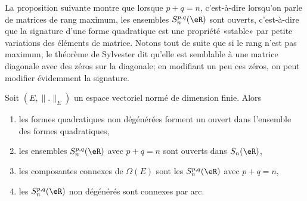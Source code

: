 La proposition suivante montre que lorsque \( p+q=n\), c'est-à-dire lorsqu'on parle de matrices de rang maximum, les ensembles \( S_n^{p,q}(\eR)\) sont ouverts, c'est-à-dire que la signature d'une forme quadratique est une propriété «stable» par petite variations des éléments de matrice. Notons tout de suite que si le rang n'est pas maximum, le théorème de Sylvester dit qu'elle est semblable à une matrice diagonale avec des zéros sur la diagonale; en modifiant un peu ces zéros, on peut modifier évidemment la signature.
\begin{proposition} \label{PropNPbnsMd}
	Soit \( (E,\| . \|_{E})\) un espace vectoriel normé de dimension finie. Alors
	\begin{enumerate}
		\item
		      les formes quadratiques non dégénérées forment un ouvert dans l'ensemble des formes quadratiques,
		\item
		      les ensembles \( S_n^{p,q}(\eR)\) avec \( p+q=n\) sont ouverts dans \( S_n(\eR)\),
		\item   \label{ItemGOhRIiViii}
		      les composantes connexes de \( \Omega(E)\) sont les \( S_n^{p,q}(\eR)\) avec \( p+q=n\),
		\item   \label{ItemGOhRIiViv}
		      les \( S_n^{p,q}(\eR)\) non dégénérés sont connexes par arc.
	\end{enumerate}
\end{proposition}

